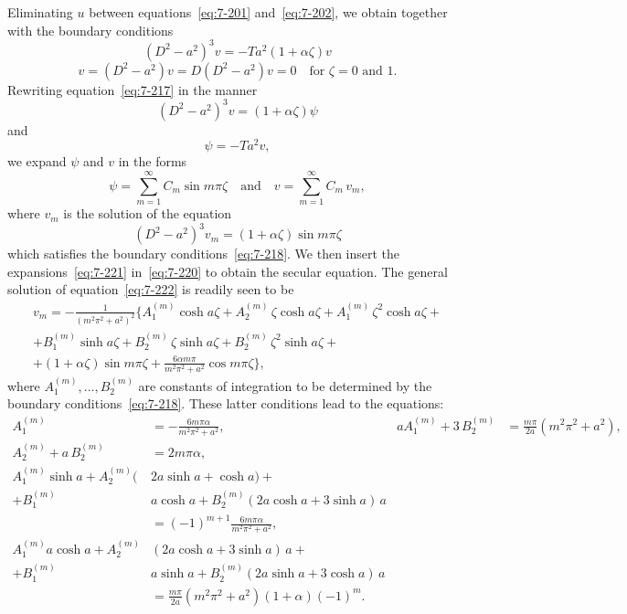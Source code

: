 Eliminating $u$ between equations~\eqref{eq:7-201} and~\eqref{eq:7-202}, we obtain
together with the boundary conditions
\begin{equation}
\label{eq:7-217}
(D^2-a^2)^3 v = -Ta^2(1+\alpha\zeta)v
\end{equation}
\begin{equation}
v = (D^2-a^2)v = D(D^2-a^2)v = 0
\quad \text{for } \zeta = 0 \text{ and } 1.
\label{eq:7-218}
\end{equation}
Rewriting equation~\eqref{eq:7-217} in the manner
\begin{equation}
\label{eq:7-219}
(D^2-a^2)^3 v = (1+\alpha\zeta)\psi
\end{equation}
and
\begin{equation}
\label{eq:7-220}
\psi = -Ta^2 v,
\end{equation}
we expand $\psi$ and $v$ in the forms
\begin{equation}
\label{eq:7-221}
\psi = \sum_{m=1}^{\infty} C_m \sin m\pi\zeta
\quad \text{and} \quad
v = \sum_{m=1}^{\infty} C_m\, v_m,
\end{equation}
where $v_m$ is the solution of the equation
\begin{equation}
\label{eq:7-222}
(D^2-a^2)^3 v_m = (1+\alpha\zeta)\sin m\pi\zeta
\end{equation}
which satisfies the boundary conditions~\eqref{eq:7-218}.  We then insert the
expansions~\eqref{eq:7-221} in~\eqref{eq:7-220} to obtain the secular equation.  The general solution of equation~\eqref{eq:7-222} is readily seen to be
\begin{multline}
\label{eq:7-223}
v_m = -\frac{1}{(m^2\pi^2+a^2)^2}
\biggl\{
A_1^{(m)}\cosh a\zeta + A_2^{(m)}\,\zeta\cosh a\zeta
+ A_1^{(m)}\,\zeta^2\cosh a\zeta + \\
+ B_1^{(m)}\sinh a\zeta
+ B_2^{(m)}\,\zeta\sinh a\zeta
+ B_2^{(m)}\,\zeta^2\sinh a\zeta + \\
+(1+\alpha\zeta)\sin m\pi\zeta
+ \frac{6\alpha m\pi}{m^2\pi^2+a^2}\cos m\pi\zeta
\biggr\},
\end{multline}
where $A_1^{(m)},\ldots, B_2^{(m)}$ are constants of integration to be determined by the
boundary conditions~\eqref{eq:7-218}.  These latter conditions lead to the equations:
\begin{align}
\label{eq:7-224}
A_1^{(m)} &= -\frac{6m\pi\alpha}{m^2\pi^2+a^2}, &
aA_1^{(m)}+3\,B_2^{(m)} &= \frac{m\pi}{2a}(m^2\pi^2+a^2),\nonumber\\
A_2^{(m)} + a\,B_2^{(m)} &= 2m\pi\alpha, & & \nonumber\\[3pt]
A_1^{(m)}\sinh a + A_2^{(m)}(&2a\sinh a + \cosh a) + \nonumber\\
+ B_1^{(m)}&a\cosh a + B_2^{(m)}(2a\cosh a + 3\sinh a)\,a\nonumber\\
&= (-1)^{m+1}\frac{6m\pi\alpha}{m^2\pi^2+a^2},\\[3pt]
A_1^{(m)}a\cosh a + A_2^{(m)}&(2a\cosh a + 3\sinh a)\,a + \nonumber\\
+ B_1^{(m)}&a\sinh a + B_2^{(m)}(2a\sinh a + 3\cosh a)\,a \nonumber\\
&= \frac{m\pi}{2a}(m^2\pi^2+a^2)(1+\alpha)(-1)^m.
\end{align}
